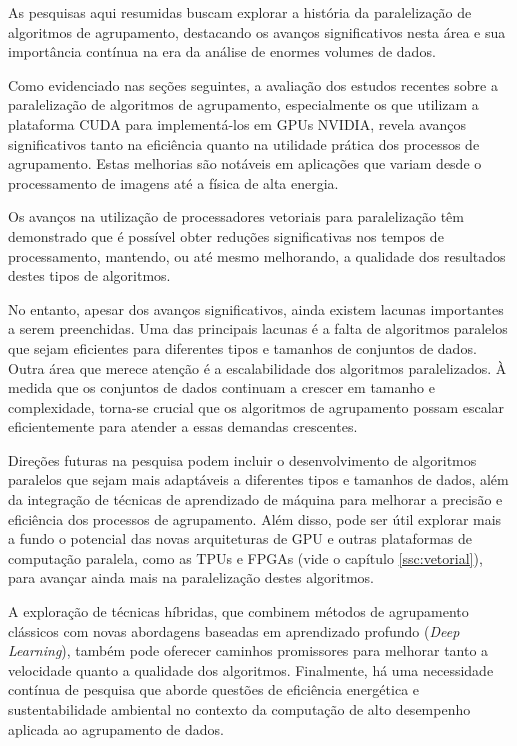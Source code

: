 \documentclass[12pt,
openright, 
oneside, %
a4paper,    %
brazil]{facom-ufu-abntex2}
\begin{document}
As pesquisas aqui resumidas buscam explorar a história da paralelização de algoritmos de agrupamento, destacando os avanços significativos nesta área e sua importância contínua na era da análise de enormes volumes de dados.


Como evidenciado nas seções seguintes, a avaliação dos estudos recentes sobre a paralelização de algoritmos de agrupamento, especialmente os que utilizam a plataforma CUDA para implementá-los em GPUs NVIDIA, revela avanços significativos tanto na eficiência quanto na utilidade prática dos processos de agrupamento. Estas melhorias são notáveis em aplicações que variam desde o processamento de imagens até a física de alta energia.

Os avanços na utilização de processadores vetoriais para paralelização têm demonstrado que é possível obter reduções significativas nos tempos de processamento, mantendo, ou até mesmo melhorando, a qualidade dos resultados destes tipos de algoritmos.

No entanto, apesar dos avanços significativos, ainda existem lacunas importantes a serem preenchidas. Uma das principais lacunas é a falta de algoritmos paralelos que sejam eficientes para diferentes tipos e tamanhos de conjuntos de dados. Outra área que merece atenção é a escalabilidade dos algoritmos paralelizados. À medida que os conjuntos de dados continuam a crescer em tamanho e complexidade, torna-se crucial que os algoritmos de agrupamento possam escalar eficientemente para atender a essas demandas crescentes.


Direções futuras na pesquisa podem incluir o desenvolvimento de algoritmos paralelos que sejam mais adaptáveis a diferentes tipos e tamanhos de dados, além da integração de técnicas de aprendizado de máquina para melhorar a precisão e eficiência dos processos de agrupamento. Além disso, pode ser útil explorar mais a fundo o potencial das novas arquiteturas de GPU e outras plataformas de computação paralela, como as TPUs e FPGAs (vide o capítulo \ref{ssc:vetorial}), para avançar ainda mais na paralelização destes algoritmos.

A exploração de técnicas híbridas, que combinem métodos de agrupamento clássicos com novas abordagens baseadas em aprendizado profundo (\textit{Deep Learning}), também pode oferecer caminhos promissores para melhorar tanto a velocidade quanto a qualidade dos algoritmos. Finalmente, há uma necessidade contínua de pesquisa que aborde questões de eficiência energética e sustentabilidade ambiental no contexto da computação de alto desempenho aplicada ao agrupamento de dados.
\end{document}
